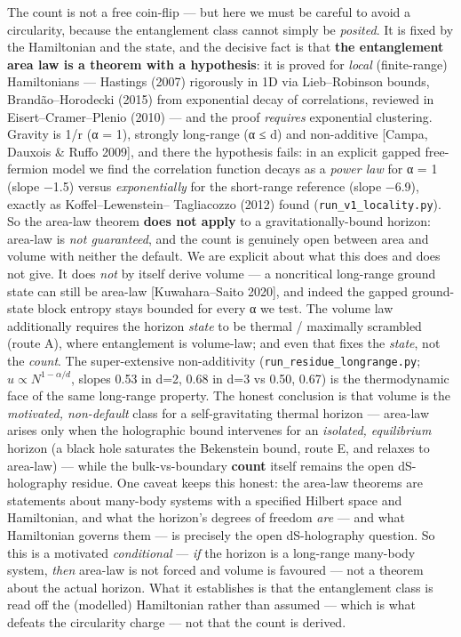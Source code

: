 \documentclass[
  10pt,
]{article}
\begin{document}
The count is not a free coin-flip --- but here we must be careful to
avoid a circularity, because the entanglement class cannot simply be
\emph{posited}. It is fixed by the Hamiltonian and the state, and the
decisive fact is that \textbf{the entanglement area law is a theorem
with a hypothesis}: it is proved for \emph{local} (finite-range)
Hamiltonians --- Hastings (2007) rigorously in 1D via Lieb--Robinson
bounds, Brandão--Horodecki (2015) from exponential decay of
correlations, reviewed in Eisert--Cramer--Plenio (2010) --- and the
proof \emph{requires} exponential clustering. Gravity is 1/r (α = 1),
strongly long-range (α ≤ d) and non-additive {[}Campa, Dauxois \& Ruffo
2009{]}, and there the hypothesis fails: in an explicit gapped
free-fermion model we find the correlation function decays as a
\emph{power law} for α = 1 (slope −1.5) versus \emph{exponentially} for
the short-range reference (slope −6.9), exactly as Koffel--Lewenstein--
Tagliacozzo (2012) found (\texttt{run\_v1\_locality.py}). So the
area-law theorem \textbf{does not apply} to a gravitationally-bound
horizon: area-law is \emph{not guaranteed}, and the count is genuinely
open between area and volume with neither the default. We are explicit
about what this does and does not give. It does \emph{not} by itself
derive volume --- a noncritical long-range ground state can still be
area-law {[}Kuwahara--Saito 2020{]}, and indeed the gapped ground-state
block entropy stays bounded for every α we test. The volume law
additionally requires the horizon \emph{state} to be thermal / maximally
scrambled (route A), where entanglement is volume-law; and even that
fixes the \emph{state}, not the \emph{count}. The super-extensive
non-additivity (\texttt{run\_residue\_longrange.py};
\(u \propto  N^{1-\alpha /d}\), slopes 0.53 in d=2, 0.68 in d=3 vs 0.50,
0.67) is the thermodynamic face of the same long-range property. The
honest conclusion is that volume is the \emph{motivated, non-default}
class for a self-gravitating thermal horizon --- area-law arises only
when the holographic bound intervenes for an \emph{isolated,
equilibrium} horizon (a black hole saturates the Bekenstein bound, route
E, and relaxes to area-law) --- while the bulk-vs-boundary
\textbf{count} itself remains the open dS-holography residue. One caveat
keeps this honest: the area-law theorems are statements about many-body
systems with a specified Hilbert space and Hamiltonian, and what the
horizon's degrees of freedom \emph{are} --- and what Hamiltonian governs
them --- is precisely the open dS-holography question. So this is a
motivated \emph{conditional} --- \emph{if} the horizon is a long-range
many-body system, \emph{then} area-law is not forced and volume is
favoured --- not a theorem about the actual horizon. What it establishes
is that the entanglement class is read off the (modelled) Hamiltonian
rather than assumed --- which is what defeats the circularity charge ---
not that the count is derived.
\end{document}
